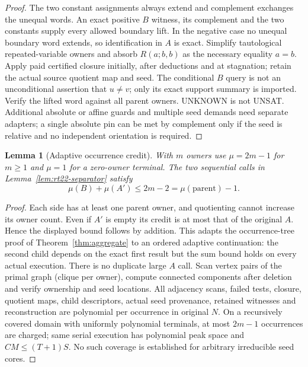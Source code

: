 \documentclass[11pt]{article}
\newtheorem{lemma}[theorem]{Lemma}
\begin{document}
\begin{proof}
The two constant assignments always extend and complement exchanges the unequal words. An exact positive $B$ witness, its complement and the two constants supply every allowed boundary lift. In the negative case no unequal boundary word extends, so identification in $A$ is exact. Simplify tautological repeated-variable owners and absorb $R(a;b,b)$ as the necessary equality $a=b$. Apply paid certified closure initially, after deductions and at stagnation; retain the actual source quotient map and seed. The conditional $B$ query is not an unconditional assertion that $u\ne v$; only its exact support summary is imported. Verify the lifted word against all parent owners. UNKNOWN is not UNSAT. Additional absolute or affine guards and multiple seed demands need separate adapters; a single absolute pin can be met by complement only if the seed is relative and no independent orientation is required.
\end{proof}
\begin{lemma}[Adaptive occurrence credit]\label{lem:rt22-credit}
With $m$ owners use $\mu=2m-1$ for $m\ge1$ and $\mu=1$ for a zero-owner terminal. The two sequential calls in Lemma~\ref{lem:rt22-separator} satisfy
\[
\mu(B)+\mu(A')\le 2m-2=\mu(\mathrm{parent})-1.
\]
\end{lemma}
\begin{proof}
Each side has at least one parent owner, and quotienting cannot increase its owner count. Even if $A'$ is empty its credit is at most that of the original $A$. Hence the displayed bound follows by addition. This adapts the occurrence-tree proof of Theorem~\ref{thm:aggregate} to an ordered adaptive continuation: the second child depends on the exact first result but the sum bound holds on every actual execution. There is no duplicate large $A$ call. Scan vertex pairs of the primal graph (clique per owner), compute connected components after deletion and verify ownership and seed locations. All adjacency scans, failed tests, closure, quotient maps, child descriptors, actual seed provenance, retained witnesses and reconstruction are polynomial per occurrence in original $N$. On a recursively covered domain with uniformly polynomial terminals, at most $2m-1$ occurrences are charged; same serial execution has polynomial peak space and $CM\le(T+1)S$. No such coverage is established for arbitrary irreducible seed cores.
\end{proof}
\end{document}
